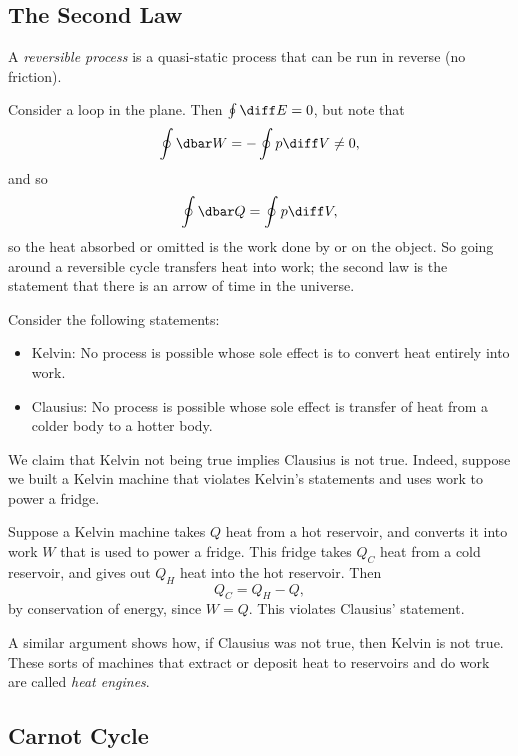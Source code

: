 \documentclass[12pt]{article}
\begin{document}
\subsection{The Second Law}
\label{sub:law_2}

\begin{definition}
	A \emph{reversible process} is a quasi-static process that can be run in reverse (no friction).
\end{definition}

Consider a loop in the plane. Then $\oint \diff E = 0$, but note that
\[
\oint \dbar W = -\oint p \diff V \neq 0,
\]
and so
\[
\oint \dbar Q = \oint p \diff V,
\]
so the heat absorbed or omitted is the work done by or on the object. So going around a reversible cycle transfers heat into work; the second law is the statement that there is an arrow of time in the universe.

Consider the following statements:
\begin{itemize}
	\item Kelvin: No process is possible whose sole effect is to convert heat entirely into work.
	\item Clausius: No process is possible whose sole effect is transfer of heat from a colder body to a hotter body.
\end{itemize}

We claim that Kelvin not being true implies Clausius is not true. Indeed, suppose we built a Kelvin machine that violates Kelvin's statements and uses work to power a fridge.

Suppose a Kelvin machine takes $Q$ heat from a hot reservoir, and converts it into work $W$ that is used to power a fridge. This fridge takes $Q_C$ heat from a cold reservoir, and gives out $Q_H$ heat into the hot reservoir. Then
\[
Q_C = Q_H - Q,
\]
by conservation of energy, since $W = Q$. This violates Clausius' statement.

A similar argument shows how, if Clausius was not true, then Kelvin is not true. These sorts of machines that extract or deposit heat to reservoirs and do work are called \emph{heat engines}.

\subsection{Carnot Cycle}
\label{sub:car_cy}
\end{document}
